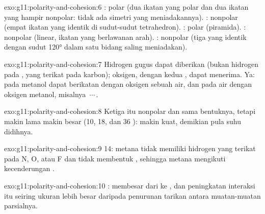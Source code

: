 \begin{solution}{exo:g11:polarity-and-cohesion:6}
: polar (dua ikatan  yang polar dan dua ikatan
 yang hampir nonpolar: tidak ada simetri yang meniadakannya).
: nonpolar (empat ikatan yang identik di sudut-sudut
tetrahedron). : polar (piramida). : nonpolar (linear,
ikatan yang berlawanan arah). : nonpolar (tiga 
yang identik dengan sudut \ang{120} dalam satu bidang saling
meniadakan).
\end{solution}

\begin{solution}{exo:g11:polarity-and-cohesion:7}
Hidrogen gugus  dapat diberikan (bukan hidrogen pada ,
yang terikat pada karbon);  oksigen, dengan kedua , dapat menerima. Ya:  pada metanol dapat berikatan
dengan oksigen sebuah  air, dan  pada air dengan oksigen
metanol, misalnya \,$\cdots$\,.
\end{solution}

\begin{solution}{exo:g11:polarity-and-cohesion:8}
Ketiga  itu nonpolar dan sama bentuknya, tetapi makin lama makin
besar (10, 18, dan 36 ):  makin kuat,
demikian pula suhu didihnya.
\end{solution}

\begin{solution}{exo:g11:polarity-and-cohesion:9}
 14: metana tidak memiliki hidrogen yang terikat pada N, O,
atau F dan tidak membentuk , sehingga metana mengikuti
kecenderungan .
\end{solution}

\begin{solution}{exo:g11:polarity-and-cohesion:10}
:  membesar dari  ke ,
dan peningkatan interaksi itu seiring ukuran lebih besar daripada
penurunan tarikan antara muatan-muatan parsialnya.
\end{solution}

